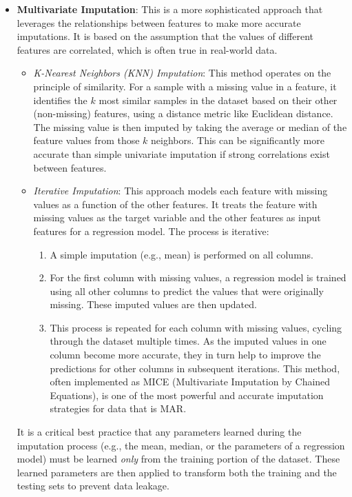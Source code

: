 \begin{itemize}
    \item \textbf{Multivariate Imputation}: This is a more sophisticated approach that leverages the relationships between features to make more accurate imputations. It is based on the assumption that the values of different features are correlated, which is often true in real-world data.
    \begin{itemize}
        \item \textit{K-Nearest Neighbors (KNN) Imputation}: This method operates on the principle of similarity. For a sample with a missing value in a feature, it identifies the $k$ most similar samples in the dataset based on their other (non-missing) features, using a distance metric like Euclidean distance. The missing value is then imputed by taking the average or median of the feature values from those $k$ neighbors. This can be significantly more accurate than simple univariate imputation if strong correlations exist between features.
        \item \textit{Iterative Imputation}: This approach models each feature with missing values as a function of the other features. It treats the feature with missing values as the target variable and the other features as input features for a regression model. The process is iterative:
        \begin{enumerate}
            \item A simple imputation (e.g., mean) is performed on all columns.
            \item For the first column with missing values, a regression model is trained using all other columns to predict the values that were originally missing. These imputed values are then updated.
            \item This process is repeated for each column with missing values, cycling through the dataset multiple times. As the imputed values in one column become more accurate, they in turn help to improve the predictions for other columns in subsequent iterations. This method, often implemented as MICE (Multivariate Imputation by Chained Equations), is one of the most powerful and accurate imputation strategies for data that is MAR.
        \end{enumerate}
\end{itemize}
It is a critical best practice that any parameters learned during the imputation process (e.g., the mean, median, or the parameters of a regression model) must be learned \textit{only} from the training portion of the dataset. These learned parameters are then applied to transform both the training and the testing sets to prevent data leakage.


\end{itemize}
